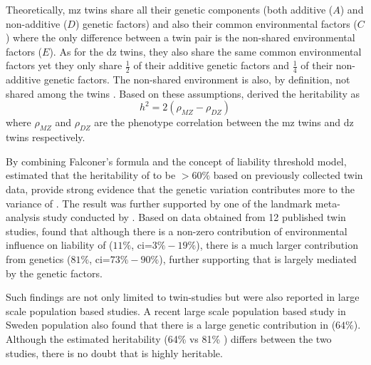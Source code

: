 	Theoretically, \gls{mz} twins share all their genetic components (both additive ($A$) and non-additive ($D$) genetic factors) and also their common environmental factors ($C$) where the only difference between a twin pair is the non-shared environmental factors ($E$). 
	As for the \gls{dz} twins, they also share the same common environmental factors yet they only share $\frac{1}{2}$ of their additive genetic factors and $\frac{1}{4}$ of their non-additive genetic factors. 
	The non-shared environment is also, by definition, not shared among the twins \citep{Rijsdijk2002}.
	Based on these assumptions, \cite{Falconer1996} derived the heritability as
	\begin{equation}
	h^2 = 2(\rho_{MZ}-\rho_{DZ})
	\end{equation}
	where $\rho_{MZ}$ and $\rho_{DZ}$ are the phenotype correlation between the \gls{mz} twins and \gls{dz} twins respectively.
	
	By combining Falconer's formula and the concept of liability threshold model, \citet{Gottesman1967} estimated that the heritability of  to be $>60\%$ based on previously collected twin data, provide strong evidence that the genetic variation contributes more to the variance of .
	The result was further supported by one of the landmark meta-analysis study conducted by \citet{Sullivan2003}.
	Based on data obtained from 12 published  twin studies, \citet{Sullivan2003} found that although there is a non-zero contribution of environmental influence on liability of  ($11\%$, \gls{ci}=$3\%-19\%$), there is a much larger contribution from genetics ($81\%$, \gls{ci}=$73\%-90\%$), further supporting that  is largely mediated by the genetic factors.
	
	Such findings are not only limited to twin-studies but were also reported in large scale population based studies.
	A recent large scale population based study in Sweden population \citep{Lichtenstein2009} also found that there is a large genetic contribution in  ($64\%$).
	Although the estimated heritability (64\% \citep{Lichtenstein2009} vs 81\% \citep{Sullivan2003}) differs between the two studies, there is no doubt that  is highly heritable.
	
